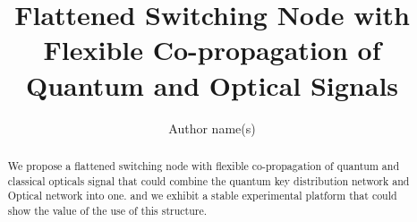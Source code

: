 \documentclass[letterpaper,10pt]{article}
\begin{document}
\title{Flattened Switching Node with Flexible Co-propagation of Quantum and Optical Signals}
\author{Author name(s)}
\address{State Key Laboratory of Information Photonics and Optical Communications, School of Information and Telecommunication Engineering, BUPT Beijing, China, 100876}
\begin{abstract}
\noindent We propose a flattened switching node with flexible co-propagation of quantum and classical opticals signal that could combine the quantum key distribution network and Optical network into one. and we exhibit a stable experimental platform that could show the value of the use of this structure.
\end{abstract}
\end{document}

